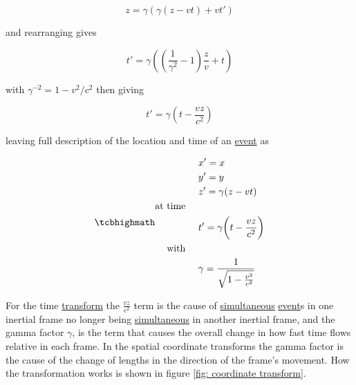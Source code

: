 \begin{equation}
	z = {\gamma} ( {\gamma} (z-vt)+vt{'})
\end{equation}

and rearranging gives

\begin{equation}
	t{'} = {\gamma} \left( \left( \dfrac{1}{{\gamma}^2}-1 \right)\frac{z}{v} + t \right)
\end{equation}

with ${\gamma}^{-2}=1-v^2/c^2$ then giving

\begin{equation}
	t{'} = {\gamma} \left( t - \dfrac{vz}{c^2} \right)
\end{equation}

leaving full description of the location and time of an \hyperlink{def-event}{event} as

\begin{equation}
	\mhl{
		\begin{aligned}
			 & x{'}=x                                           \\
			 & y{'}=y                                           \\
			 & z{'} = {\gamma} (z-vt)                           \\
			\text{at time \ \ \ }                             \\
			 & t{'}={\gamma} \bigg(t-\frac{vz}{c^2}\bigg)       \\
			\text{with \ \ \ }                                \\
			 & {\gamma} = \dfrac{1}{\sqrt{1-\frac{v^2}{c^2}}}
		\end{aligned}
	}
	\label{eq: Lorentz transformation}
\end{equation}

For the time \hyperlink{def-transform}{transform} the $\frac{vz}{c^2}$ term is the cause of \hyperlink{def-simultaneity}{simultaneous} \hyperlink{def-event}{event}s in one inertial frame no longer being \hyperlink{def-simultaneity}{simultaneous} in another inertial frame, and the gamma factor ${\gamma}$, is the term that causes the overall change in how fast time flows relative in each frame. In the spatial coordinate transforms the gamma factor is the cause of the change of lengths in the direction of the frame's movement. How the transformation works is shown in figure \ref{fig: coordinate transform}.


